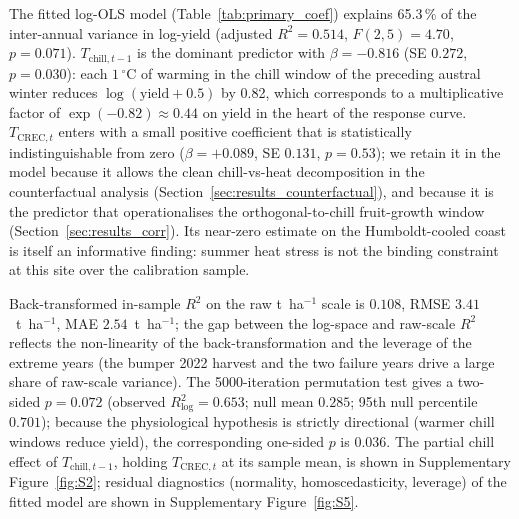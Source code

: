 \documentclass[agronomy,article,submit,pdftex,moreauthors]{Definitions/mdpi}
\begin{document}
The fitted log-OLS model (Table~\ref{tab:primary_coef}) explains 65.3\,\% of the inter-annual variance in log-yield (adjusted $R^{2}=0.514$, $F(2,5)=4.70$, $p=0.071$). $T_{\text{chill},t-1}$ is the dominant predictor with $\beta=-0.816$ (SE $0.272$, $p=0.030$): each $1\,^\circ$C of warming in the chill window of the preceding austral winter reduces $\log(\text{yield}+0.5)$ by 0.82, which corresponds to a multiplicative factor of $\exp(-0.82)\approx 0.44$ on yield in the heart of the response curve. $T_{\text{CREC},t}$ enters with a small positive coefficient that is statistically indistinguishable from zero ($\beta=+0.089$, SE $0.131$, $p=0.53$); we retain it in the model because it allows the clean chill-vs-heat decomposition in the counterfactual analysis (Section~\ref{sec:results_counterfactual}), and because it is the predictor that operationalises the orthogonal-to-chill fruit-growth window (Section~\ref{sec:results_corr}). Its near-zero estimate on the Humboldt-cooled coast is itself an informative finding: summer heat stress is not the binding constraint at this site over the calibration sample.

Back-transformed in-sample $R^{2}$ on the raw t~ha$^{-1}$ scale is $0.108$, RMSE $3.41$~t~ha$^{-1}$, MAE $2.54$~t~ha$^{-1}$; the gap between the log-space and raw-scale $R^{2}$ reflects the non-linearity of the back-transformation and the leverage of the extreme years (the bumper 2022 harvest and the two failure years drive a large share of raw-scale variance). The 5000-iteration permutation test gives a two-sided $p=0.072$ (observed $R^{2}_{\log}=0.653$; null mean $0.285$; 95th null percentile $0.701$); because the physiological hypothesis is strictly directional (warmer chill windows reduce yield), the corresponding one-sided $p$ is $0.036$. The partial chill effect of $T_{\text{chill},t-1}$, holding $T_{\text{CREC},t}$ at its sample mean, is shown in Supplementary Figure~\ref{fig:S2}; residual diagnostics (normality, homoscedasticity, leverage) of the fitted model are shown in Supplementary Figure~\ref{fig:S5}.
\end{document}
